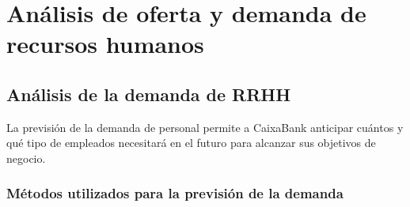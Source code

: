 %
%
%
%

\section{Análisis de oferta y demanda de recursos humanos}

\subsection{Análisis de la demanda de RRHH}

La previsión de la demanda de personal permite a CaixaBank anticipar cuántos
y qué tipo de empleados necesitará en el futuro para alcanzar sus objetivos
de negocio.

\subsubsection{Métodos utilizados para la previsión de la demanda}

